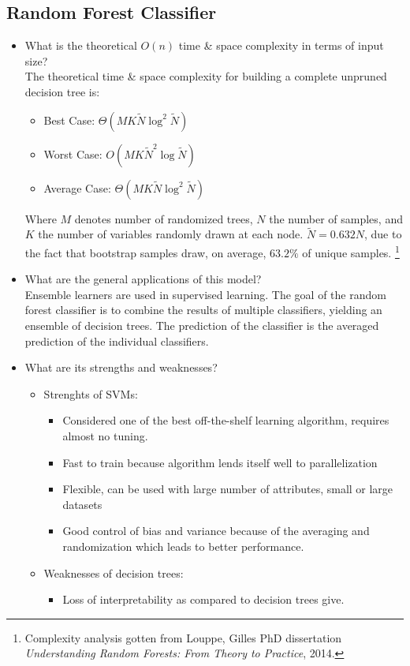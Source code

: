 \documentclass[12pt]{article}
\begin{document}
\subsection*{Random Forest Classifier}
\begin{itemize} 
\item What is the theoretical $O(n)$ time \& space complexity in terms of input size?\\
The theoretical time \& space complexity for building a complete unpruned decision tree is:
\begin{itemize}[noitemsep,nolistsep]
\item Best Case: $\Theta(MK\widetilde{N}\log^2 \widetilde{N})$ 
\item Worst Case: $O(MK\widetilde{N}^2\log \widetilde{N})$ 
\item Average Case: $\Theta(MK\widetilde{N}\log^2 \widetilde{N})$
\end{itemize}
Where $M$ denotes number of randomized trees, $N$ the number of samples, and $K$ the number of variables randomly drawn at each node. $\widetilde{N} = 0.632 N$, due to the fact that bootstrap samples draw, on average, $63.2\%$ of unique samples. 
\footnote{Complexity analysis gotten from Louppe, Gilles PhD dissertation \textit{Understanding Random Forests: From Theory to Practice}, 2014.}

\item What are the general applications of this model?\\
Ensemble learners are used in supervised learning. The goal of the random forest classifier is to combine the results of multiple classifiers, yielding an ensemble of decision trees. The prediction of the classifier is the averaged prediction of the individual classifiers.

\item What are its strengths and weaknesses?\\
\begin{itemize}[noitemsep,nolistsep]
       \item Strenghts of SVMs:
              \begin{itemize}[noitemsep,nolistsep]
                     \item Considered one of the best off-the-shelf learning algorithm, requires almost no tuning. 
                     \item Fast to train because algorithm lends itself well to parallelization
                     \item Flexible, can be used with large number of attributes, small or large datasets
                     \item Good control of bias and variance because of the averaging and randomization which leads to better performance.
              \end{itemize}
       \item Weaknesses of decision trees:
              \begin{itemize}[noitemsep,nolistsep]
                     \item Loss of interpretability as compared to decision trees give.
              \end{itemize}
       \end{itemize}



\end{itemize}
\end{document}
